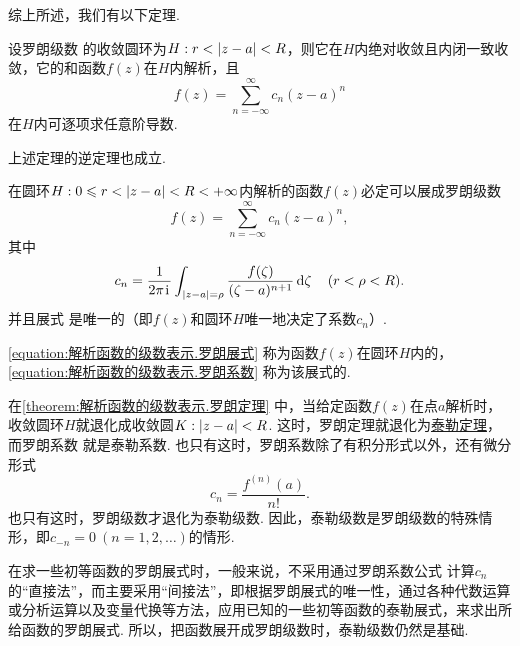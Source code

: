 综上所述，我们有以下定理.
\begin{theorem}
设罗朗级数  的收敛圆环为\(H: r < \abs{z-a} < R\)，则它在\(H\)内绝对收敛且内闭一致收敛，它的和函数\(f(z)\)在\(H\)内解析，且\[
f(z) = \sum\limits_{n=-\infty}^{\infty} c_n (z-a)^n
\]在\(H\)内可逐项求任意阶导数.
\end{theorem}

上述定理的逆定理也成立.
\begin{theorem}[罗朗定理]\label{theorem:解析函数的级数表示.罗朗定理}
在圆环\(H: 0 \leqslant r < \abs{z-a} < R < +\infty\)内解析的函数\(f(z)\)必定可以展成罗朗级数\begin{equation}\label{equation:解析函数的级数表示.罗朗展式}
f(z) = \sum\limits_{n=-\infty}^{\infty} c_n (z-a)^n,
\end{equation}其中\begin{equation}\label{equation:解析函数的级数表示.罗朗系数}
c_n = \frac{1}{2\pi\kern1pt\mathrm{i}\kern1pt} \int_{\abs{z-a}=\rho} \frac{f(\zeta)}{(\zeta-a)^{n+1}} \dd{\zeta}
\quad(r<\rho<R).
\end{equation}
并且展式  是唯一的（即\(f(z)\)和圆环\(H\)唯一地决定了系数\(c_n\)）.
\end{theorem}
\cref{equation:解析函数的级数表示.罗朗展式} 称为函数\(f(z)\)在圆环\(H\)内的，\cref{equation:解析函数的级数表示.罗朗系数} 称为该展式的.

在\cref{theorem:解析函数的级数表示.罗朗定理} 中，当给定函数\(f(z)\)在点\(a\)解析时，收敛圆环\(H\)就退化成收敛圆\(K: \abs{z-a}<R\).
这时，罗朗定理就退化为\hyperref[theorem:解析函数的级数表示.泰勒定理]{泰勒定理}，而罗朗系数  就是泰勒系数.
也只有这时，罗朗系数除了有积分形式以外，还有微分形式\[
c_n = \frac{f^{(n)}(a)}{n!}.
\]也只有这时，罗朗级数才退化为泰勒级数.
因此，泰勒级数是罗朗级数的特殊情形，即\(c_{-n} = 0\ (n=1,2,\dotsc)\)的情形.

在求一些初等函数的罗朗展式时，一般来说，不采用通过罗朗系数公式  计算\(c_n\)的“直接法”，而主要采用“间接法”，即根据罗朗展式的唯一性，通过各种代数运算或分析运算以及变量代换等方法，应用已知的一些初等函数的泰勒展式，来求出所给函数的罗朗展式.
所以，把函数展开成罗朗级数时，泰勒级数仍然是基础.

